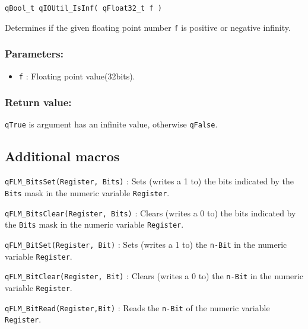 \noindent\hrulefill

\begin{lstlisting}[style=CStyle]
qBool_t qIOUtil_IsInf( qFloat32_t f )
\end{lstlisting}

Determines if the given floating point number \lstinline{f} is positive or negative infinity. 

\subsubsection*{Parameters:}
\begin{itemize}
    \item \lstinline{f} : Floating point value(32bits).
\end{itemize}

\subsubsection*{Return value:}
\lstinline{qTrue} is argument has an infinite value, otherwise \lstinline{qFalse}.

\subsection{Additional macros}

\lstinline{qFLM_BitsSet(Register, Bits)} : Sets (writes a 1 to) the bits indicated by the \lstinline{Bits} mask in the numeric variable \lstinline{Register}.

\noindent\hrulefill

\lstinline{qFLM_BitsClear(Register, Bits)} : Clears (writes a 0 to) the bits indicated by the \lstinline{Bits} mask in the numeric variable \lstinline{Register}.

\noindent\hrulefill

\lstinline{qFLM_BitSet(Register, Bit)} : Sets (writes a 1 to) the \lstinline{n-Bit} in the numeric variable \lstinline{Register}.

\noindent\hrulefill

\lstinline{qFLM_BitClear(Register, Bit)} : Clears (writes a 0 to) the \lstinline{n-Bit} in the numeric variable \lstinline{Register}.

\noindent\hrulefill

\lstinline{qFLM_BitRead(Register,Bit)} : Reads the \lstinline{n-Bit} of the numeric variable \lstinline{Register}.

\noindent\hrulefill

